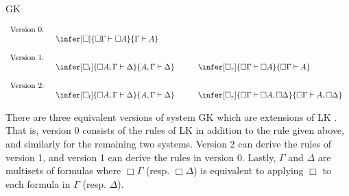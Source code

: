 \begin{entry}{GK}  


\begin{calculus}
  \[
  \begin{array}{lll}
    \text{Version 0:}\\
    & \begin{array}{ccc}
        \infer[\Box]{\Box \Gamma \vdash \Box A}{\Gamma \vdash A}    
      \end{array}
    \\\\
    \text{Version 1:}\\
    & \begin{array}{ccc}
        \infer[\Box_l]{\Box A,\Gamma \vdash \Delta}{A,\Gamma \vdash \Delta}
        & \quad &
        \infer[\Box_r]{\Box \Gamma \vdash \Box A}{\Box \Gamma \vdash A}
      \end{array}
    \\\\
    \text{Version 2:}\\
    & \begin{array}{ccc}
        \infer[\Box_l]{\Box A,\Gamma \vdash \Delta}{A,\Gamma \vdash \Delta}
        & \quad &
        \infer[\Box_r]{\Box \Gamma \vdash \Box A,\Box \Delta}{\Box \Gamma \vdash A,\Box \Delta}
      \end{array}
  \end{array}
  \]
\end{calculus}


\begin{clarifications}
There are three equivalent versions of system GK \cite{Ono:1998} which
are extensions of LK .  That is, version 0 consists of
the rules of LK in addition to the rule given above, and similarly for
the remaining two systems.  Version 2 can derive the rules of version
1, and version 1 can derive the rules in version 0.  Lastly, $\Gamma$
and $\Delta$ are multisets of formulas where $\Box \Gamma$
(resp. $\Box \Delta$) is equivalent to applying $\Box$ to each formula
in $\Gamma$ (resp. $\Delta$).
\end{clarifications}


\end{entry}
